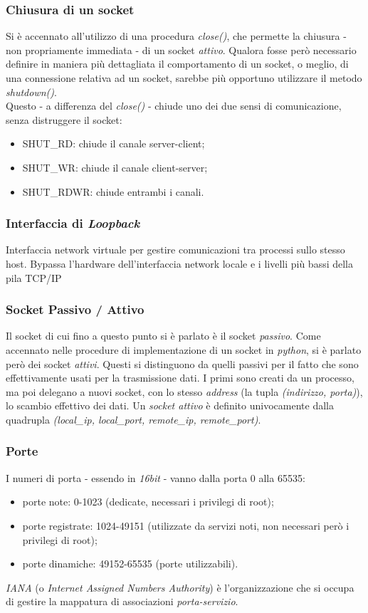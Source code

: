\subsubsection{Chiusura di un socket}
Si è accennato all'utilizzo di una procedura \textit{close()}, che permette la chiusura - non propriamente immediata - di un socket \textit{attivo}. Qualora fosse però necessario definire in maniera più dettagliata il comportamento di un socket, o meglio, di una connessione relativa ad un socket, sarebbe più opportuno utilizzare il metodo \textit{shutdown()}. \\
Questo - a differenza del \textit{close()} - chiude uno dei due sensi di comunicazione, senza distruggere il socket:
    \begin{itemize}
        \item SHUT\_RD: chiude il canale server-client;
        \item SHUT\_WR: chiude il canale client-server;
        \item SHUT\_RDWR: chiude entrambi i canali.
    \end{itemize}

\subsubsection{Interfaccia di \textit{Loopback}}
Interfaccia network virtuale per gestire comunicazioni tra processi sullo stesso host. Bypassa l'hardware dell'interfaccia network locale e i livelli più bassi della pila TCP/IP

\subsubsection{Socket Passivo / Attivo}
Il socket di cui fino a questo punto si è parlato è il socket \textit{passivo}. Come accennato nelle procedure di implementazione di un socket in \textit{python}, si è parlato però dei socket \textit{attivi}. Questi si distinguono da quelli passivi per il fatto che sono effettivamente usati per la trasmissione dati. I primi sono creati da un processo, ma poi delegano a nuovi socket, con lo stesso \textit{address} (la tupla \textit{(indirizzo, porta)}), lo scambio effettivo dei dati. Un \textit{socket attivo} è definito univocamente dalla quadrupla \textit{(local\_ip, local\_port, remote\_ip, remote\_port)}.

\subsubsection{Porte}
I numeri di porta - essendo in \textit{16bit} - vanno dalla porta 0 alla 65535:
\begin{itemize}
    \item porte note: 0-1023 (dedicate, necessari i privilegi di root);
    \item porte registrate: 1024-49151 (utilizzate da servizi noti, non necessari però i privilegi di root);
    \item porte dinamiche: 49152-65535 (porte utilizzabili).
\end{itemize}
\textit{IANA} (o \textit{Internet Assigned Numbers Authority}) è l'organizzazione che si occupa di gestire la mappatura di associazioni \textit{porta-servizio}.

